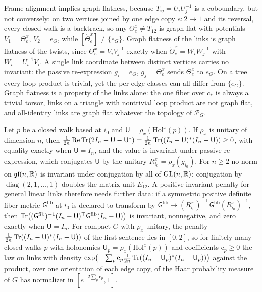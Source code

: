Frame alignment implies graph flatness, because $T_{ij}=U_iU_j^{-1}$ is a coboundary, but not
conversely: on two vertices joined by one edge copy $e:2\to1$ and its reversal, every closed walk is
a backtrack, so any $\Theta_e^x\neq T_{12}$ is graph flat with potentials $V_1=\Theta_e^x$,
$V_2=e_G$, while $[\mathring\Theta_e^x]\neq\{e_G\}$. Graph flatness of the links is graph flatness
of the twists, since $\Theta_e^x=V_iV_j^{-1}$ exactly when $\mathring\Theta_e^x=W_iW_j^{-1}$ with
$W_i=U_i^{-1}V_i$. A single link coordinate between distinct vertices carries no invariant: the passive re-expression
$g_i=e_G$, $g_j=\Theta_e^x$ sends $\Theta_e^x$ to $e_G$. On a tree every loop product is trivial,
yet the per-edge classes can all differ from $\{e_G\}$. Graph flatness is a property of the links
alone: the one fiber over $c_*$ is always a trivial torsor, links on a triangle with nontrivial loop
product are not graph flat, and all-identity links are graph flat whatever the topology of
$\mathscr P_G$. 

Let $p$ be a closed walk based at $i_0$ and $\mathsf U=\rho_x(\mathrm{Hol}^x(p))$. If $\rho_x$ is unitary
of dimension $n$, then
$\frac{1}{2n}\operatorname{Re}\operatorname{Tr}(2I_n-\mathsf U-\mathsf U^*)=\frac{1}{2n}\operatorname{Tr}((I_n-\mathsf U)^*(I_n-\mathsf U))\geq0$,
with equality exactly when $\mathsf U=I_n$, and the value is invariant under passive re-expression,
which conjugates $\mathsf U$ by the unitary $R_{i_0}^x=\rho_x(g_{i_0})$. For $n\geq2$ no norm on
$\mathfrak{gl}(n,\mathbb R)$ is invariant under conjugation by all of $\mathrm{GL}(n,\mathbb R)$: conjugation by
$\operatorname{diag}(2,1,\ldots,1)$ doubles the matrix unit $E_{12}$. A positive invariant penalty for
general linear links therefore needs further data: if a symmetric positive definite fiber metric
$\mathsf G^{\mathrm{fib}}$ at $i_0$ is declared to transform by
$\mathsf G^{\mathrm{fib}}\mapsto(R_{i_0}^x)^{-\top}\mathsf G^{\mathrm{fib}}(R_{i_0}^x)^{-1}$, then
$\operatorname{Tr}\bigl((\mathsf G^{\mathrm{fib}})^{-1}(I_n-\mathsf U)^\top\mathsf G^{\mathrm{fib}}(I_n-\mathsf U)\bigr)$
is invariant, nonnegative, and zero exactly when $\mathsf U=I_n$. For compact $G$ with $\rho_x$
unitary, the penalty $\frac{1}{2n}\operatorname{Tr}((I_n-\mathsf U)^*(I_n-\mathsf U))$ of the first sentence lies
in $[0,2]$, so for finitely many closed walks $p$ with holonomies
$\mathsf U_p=\rho_x(\mathrm{Hol}^x(p))$ and coefficients $\mathrm c_p\geq0$ the law on links with
density $\exp\bigl(-\sum_p\mathrm c_p\frac{1}{2n}\operatorname{Tr}((I_n-\mathsf U_p)^*(I_n-\mathsf U_p))\bigr)$
against the product, over one orientation of each edge copy, of the Haar probability measure of $G$
has normalizer in $[e^{-2\sum_p\mathrm c_p},1]$. 

